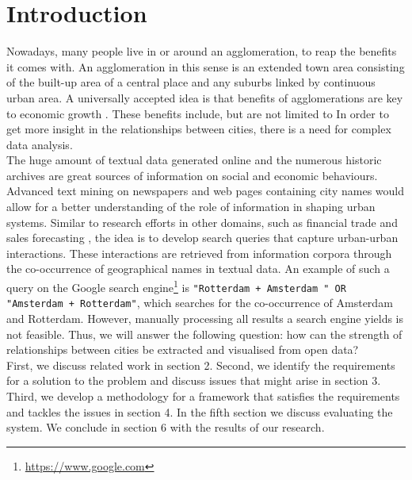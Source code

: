 \section{Introduction}

Nowadays, many people live in or around an agglomeration, to reap the benefits it comes with. An agglomeration in this sense is an extended town area consisting of the built-up area of a central place and any suburbs linked by continuous urban area. A universally accepted idea is that benefits of agglomerations are key to economic growth \cite{porter2000location}. These benefits include, but are not limited to In order to get more insight in the relationships between cities, there is a need for complex data analysis. \\

The huge amount of textual data generated online and the numerous historic archives are great sources of information on social and economic behaviours. Advanced text mining on newspapers and web pages containing city names would allow for a better understanding of the role of information in shaping urban systems. Similar to research efforts in other domains, such as financial trade \cite{preis2013quantifying} and sales forecasting \cite{wu2014future}, the idea is to develop search queries that capture urban-urban interactions. These interactions are retrieved from information corpora through the co-occurrence of geographical names in textual data. An example of such a query on the Google search engine\footnote{\url{https://www.google.com}} is \texttt{"Rotterdam + Amsterdam " OR "Amsterdam + Rotterdam"}, which searches for the co-occurrence of Amsterdam and Rotterdam. However, manually processing all results a search engine yields is not feasible. Thus, we will answer the following question: 
how can the strength of relationships between cities be extracted and visualised from open data? \\

First, we discuss related work in section 2. Second, we identify the requirements for a solution to the problem and discuss issues that might arise in section 3. Third, we develop a methodology for a framework that satisfies the requirements and tackles the issues in section 4. In the fifth section we discuss evaluating the system. We conclude in section 6 with the results of our research.